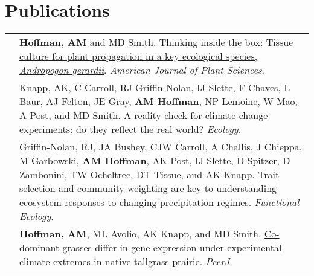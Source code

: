 \documentclass[letterpaper]{deedy-resume} %
\begin{document}

\section{Publications}
\begin{tabular}{>{\raggedleft\arraybackslash}p{2cm}p{16cm}}

2018 & \textbf{Hoffman, AM} and MD Smith. \href{https://www.scirp.org/Journal/PaperInformation.aspx?PaperID=87129}{Thinking inside the box: Tissue culture for plant propagation in a key ecological species, \textit{Andropogon gerardii}}. \textcolor{special}{\textit{American Journal of Plant Sciences}}.\\

2018 & Knapp, AK, C Carroll, RJ Griffin-Nolan, IJ Slette, F Chaves, L Baur, AJ Felton, JE Gray, \textbf{AM Hoffman}, NP Lemoine, W Mao, A Post, and MD Smith. A reality check for climate change experiments: do they reflect the real world? \textcolor{special}{\textit{Ecology}}. \\

2018 & Griffin-Nolan, RJ, JA Bushey, CJW Carroll, A Challis, J Chieppa, M Garbowski, \textbf{AM Hoffman}, AK Post, IJ Slette, D Spitzer, D Zambonini, TW Ocheltree, DT Tissue, and AK Knapp. \href{https://besjournals.onlinelibrary.wiley.com/doi/abs/10.1111/1365-2435.13135}{Trait selection and community weighting are key to understanding ecosystem responses to changing precipitation regimes.} \textcolor{special}{\textit{Functional Ecology}}.\\

2018 & \textbf{Hoffman, AM}, ML Avolio, AK Knapp, and MD Smith. \href{https://peerj.com/articles/4394.pdf}{Co-dominant grasses differ in gene expression under experimental climate extremes in native tallgrass prairie.} \textcolor{special}{\textit{PeerJ}}.\\

\end{tabular}
\end{document}
